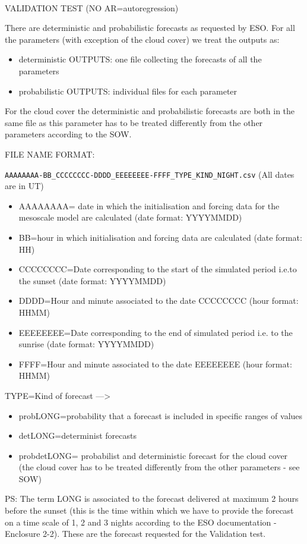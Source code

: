 
\begin{center}
\HRule \\[0.4cm]
VALIDATION TEST (NO AR=autoregression)
\HRule \\[0.4cm]
\end{center}

There are deterministic and probabilistic forecasts as requested by ESO. For all the parameters (with exception of the cloud cover) we treat the outputs as:
\begin{itemize}
\item deterministic OUTPUTS: one file collecting the forecasts of all the parameters 
\item probabilistic OUTPUTS: individual files for each parameter 
\end{itemize}

For the cloud cover the deterministic and probabilistic forecasts are both in the same file as this parameter has to be treated differently from the other parameters according to the SOW.

FILE NAME FORMAT:

\verb+AAAAAAAA-BB_CCCCCCCC-DDDD_EEEEEEEE-FFFF_TYPE_KIND_NIGHT.csv+
(All dates are in UT)
\begin{itemize}
\item AAAAAAAA= date in which the initialisation and forcing data for the mesoscale model are calculated (date format: YYYYMMDD)
\item BB=hour in which initialisation and forcing data are calculated (date format: HH)
\item CCCCCCCC=Date corresponding to the start of the simulated period i.e.to the sunset (date format: YYYYMMDD)
\item DDDD=Hour and minute associated to the date CCCCCCCC (hour format: HHMM)
\item EEEEEEEE=Date corresponding to the end of simulated period i.e. to the sunrise (date format: YYYYMMDD)
\item FFFF=Hour and minute associated to the date EEEEEEEE (hour format: HHMM)
\end{itemize}

TYPE=Kind of forecast ---> 
\begin{itemize}	
\item probLONG=probability that a forecast is included in specific ranges of values
\item detLONG=determinist forecasts
\item probdetLONG= probabilist and deterministic forecast for the cloud cover (the cloud cover has to be treated differently from the other parameters - see SOW)
\end{itemize}	
%
%
PS: The term LONG is associated to the forecast delivered at maximum 2 hours before the sunset (this is the time within which we have to provide the forecast on a time scale of 1, 2 and 3 nights according to the ESO documentation - Enclosure 2-2). These are the forecast requested for the Validation test.


